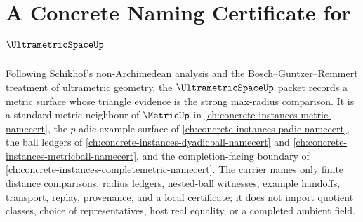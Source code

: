 \chapter{A Concrete Naming Certificate for $\UltrametricSpaceUp$}
\label{ch:concrete-instances-ultrametricspace-namecert}

Following Schikhof's non-Archimedean analysis and the Bosch--Guntzer--Remmert treatment of ultrametric geometry, the $\UltrametricSpaceUp$ packet records a metric surface whose triangle evidence is the strong max-radius comparison. It is a standard metric neighbour of $\MetricUp$ in \autoref{ch:concrete-instances-metric-namecert}, the $p$-adic example surface of \autoref{ch:concrete-instances-padic-namecert}, the ball ledgers of \autoref{ch:concrete-instances-dyadicball-namecert} and \autoref{ch:concrete-instances-metricball-namecert}, and the completion-facing boundary of \autoref{ch:concrete-instances-completemetric-namecert}. The carrier names only finite distance comparisons, radius ledgers, nested-ball witnesses, example handoffs, transport, replay, provenance, and a local certificate; it does not import quotient classes, choice of representatives, host real equality, or a completed ambient field.

